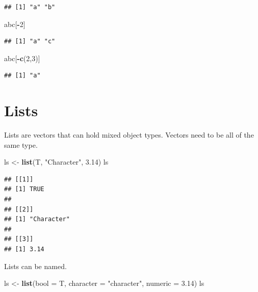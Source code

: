 \documentclass[]{book}
\newenvironment{Shaded}{\begin{snugshade}}{\end{snugshade}}
\newcommand{\DataTypeTok}[1]{\textcolor[rgb]{0.13,0.29,0.53}{#1}}
\newcommand{\DecValTok}[1]{\textcolor[rgb]{0.00,0.00,0.81}{#1}}
\newcommand{\FloatTok}[1]{\textcolor[rgb]{0.00,0.00,0.81}{#1}}
\newcommand{\KeywordTok}[1]{\textcolor[rgb]{0.13,0.29,0.53}{\textbf{#1}}}
\newcommand{\NormalTok}[1]{#1}
\newcommand{\OperatorTok}[1]{\textcolor[rgb]{0.81,0.36,0.00}{\textbf{#1}}}
\newcommand{\StringTok}[1]{\textcolor[rgb]{0.31,0.60,0.02}{#1}}
\begin{document}
\begin{verbatim}
## [1] "a" "b"
\end{verbatim}

\begin{Shaded}
\begin{Highlighting}[]
\NormalTok{abc[}\OperatorTok{-}\DecValTok{2}\NormalTok{]}
\end{Highlighting}
\end{Shaded}

\begin{verbatim}
## [1] "a" "c"
\end{verbatim}

\begin{Shaded}
\begin{Highlighting}[]
\NormalTok{abc[}\OperatorTok{-}\KeywordTok{c}\NormalTok{(}\DecValTok{2}\NormalTok{,}\DecValTok{3}\NormalTok{)]}
\end{Highlighting}
\end{Shaded}

\begin{verbatim}
## [1] "a"
\end{verbatim}

\hypertarget{lists}{%
\section{Lists}\label{lists}}

Lists are vectors that can hold mixed object types. Vectors need to be all of the same type.

\begin{Shaded}
\begin{Highlighting}[]
\NormalTok{ls <-}\StringTok{ }\KeywordTok{list}\NormalTok{(T, }\StringTok{"Character"}\NormalTok{, }\FloatTok{3.14}\NormalTok{)}
\NormalTok{ls}
\end{Highlighting}
\end{Shaded}

\begin{verbatim}
## [[1]]
## [1] TRUE
## 
## [[2]]
## [1] "Character"
## 
## [[3]]
## [1] 3.14
\end{verbatim}

Lists can be named.

\begin{Shaded}
\begin{Highlighting}[]
\NormalTok{ls <-}\StringTok{ }\KeywordTok{list}\NormalTok{(}\DataTypeTok{bool =}\NormalTok{ T, }\DataTypeTok{character =} \StringTok{"character"}\NormalTok{, }\DataTypeTok{numeric =} \FloatTok{3.14}\NormalTok{)}
\NormalTok{ls}
\end{Highlighting}
\end{Shaded}
\end{document}
